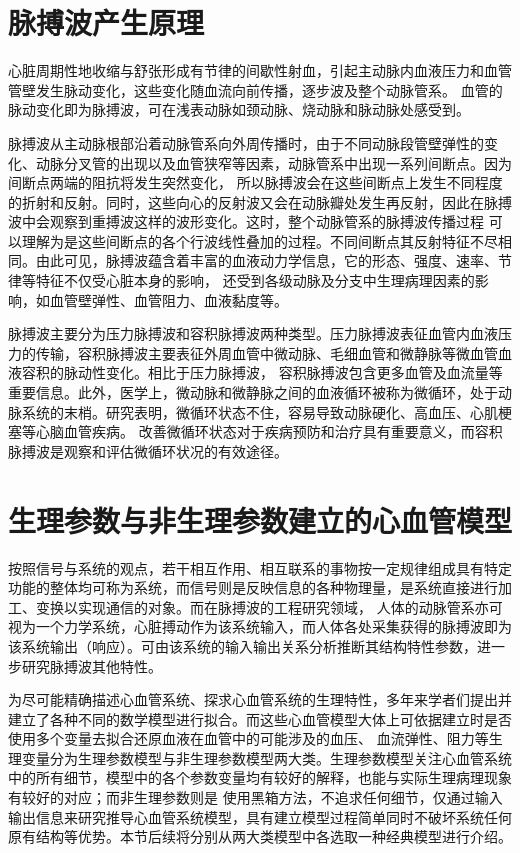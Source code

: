 \section{脉搏波产生原理}
心脏周期性地收缩与舒张形成有节律的间歇性射血，引起主动脉内血液压力和血管管壁发生脉动变化，这些变化随血流向前传播，逐步波及整个动脉管系。
血管的脉动变化即为脉搏波，可在浅表动脉如颈动脉、烧动脉和脉动脉处感受到。

脉搏波从主动脉根部沿着动脉管系向外周传播时，由于不同动脉段管壁弹性的变化、动脉分叉管的出现以及血管狭窄等因素，动脉管系中出现一系列间断点。因为间断点两端的阻抗将发生突然变化，
所以脉搏波会在这些间断点上发生不同程度的折射和反射。同时，这些向心的反射波又会在动脉瓣处发生再反射，因此在脉搏波中会观察到重搏波这样的波形变化。这时，整个动脉管系的脉搏波传播过程
可以理解为是这些间断点的各个行波线性叠加的过程。不同间断点其反射特征不尽相同。由此可见，脉搏波蕴含着丰富的血液动力学信息，它的形态、强度、速率、节律等特征不仅受心脏本身的影响，
还受到各级动脉及分支中生理病理因素的影响，如血管壁弹性、血管阻力、血液黏度等。

脉搏波主要分为压力脉搏波和容积脉搏波两种类型。压力脉搏波表征血管内血液压力的传输，容积脉搏波主要表征外周血管中微动脉、毛细血管和微静脉等微血管血液容积的脉动性变化。相比于压力脉搏波，
容积脉搏波包含更多血管及血流量等重要信息。此外，医学上，微动脉和微静脉之间的血液循环被称为微循环，处于动脉系统的末梢。研究表明，微循环状态不住，容易导致动脉硬化、高血压、心肌梗塞等心脑血管疾病。
改善微循环状态对于疾病预防和治疗具有重要意义，而容积脉搏波是观察和评估微循环状况的有效途径。
\section{生理参数与非生理参数建立的心血管模型}
按照信号与系统的观点，若干相互作用、相互联系的事物按一定规律组成具有特定功能的整体均可称为系统，而信号则是反映信息的各种物理量，是系统直接进行加工、变换以实现通信的对象。而在脉搏波的工程研究领域，
人体的动脉管系亦可视为一个力学系统，心脏搏动作为该系统输入，而人体各处采集获得的脉搏波即为该系统输出（响应）。可由该系统的输入输出关系分析推断其结构特性参数，进一步研究脉搏波其他特性。\cite{PPGYY}

为尽可能精确描述心血管系统、探求心血管系统的生理特性，多年来学者们提出并建立了各种不同的数学模型进行拟合。而这些心血管模型大体上可依据建立时是否使用多个变量去拟合还原血液在血管中的可能涉及的血压、
血流弹性、阻力等生理变量分为生理参数模型与非生理参数模型两大类\cite{PPGYY}。生理参数模型关注心血管系统中的所有细节，模型中的各个参数变量均有较好的解释，也能与实际生理病理现象有较好的对应；而非生理参数则是
使用黑箱方法，不追求任何细节，仅通过输入输出信息来研究推导心血管系统模型，具有建立模型过程简单同时不破坏系统任何原有结构等优势。本节后续将分别从两大类模型中各选取一种经典模型进行介绍。
